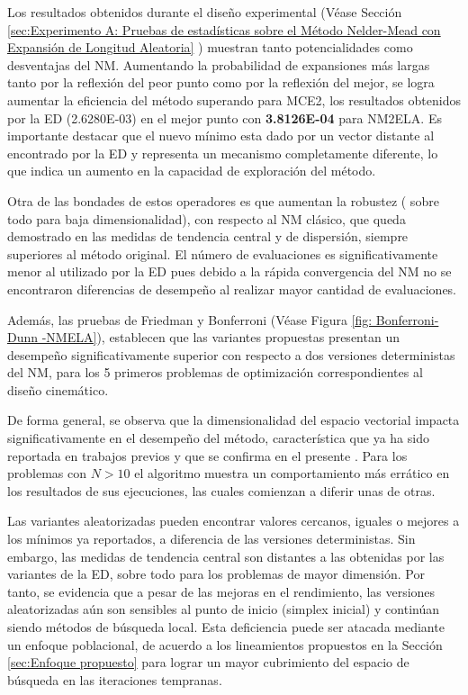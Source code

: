 Los resultados obtenidos durante el diseño experimental (Véase Sección \ref{sec:Experimento A: Pruebas de estadísticas sobre el Método Nelder-Mead con Expansión de Longitud Aleatoria} ) muestran tanto potencialidades como desventajas del NM. Aumentando la probabilidad de expansiones más largas tanto por la reflexión del peor punto como por la reflexión del mejor, se logra aumentar la eficiencia del método superando para MCE2, los resultados obtenidos por la ED (2.6280E-03) en el mejor punto con \textbf{3.8126E-04} para NM2ELA. Es importante destacar que el nuevo mínimo esta dado por un vector distante al encontrado por la ED y representa un mecanismo completamente diferente, lo que indica un aumento en la capacidad de exploración del método. 

Otra de las bondades de estos operadores es que aumentan la robustez ( sobre todo para baja dimensionalidad), con respecto al NM clásico, que queda demostrado en las medidas de tendencia central y de dispersión, siempre superiores al método original. El número de evaluaciones es significativamente menor al utilizado por la ED pues debido a la rápida convergencia del NM no se encontraron diferencias de desempeño al realizar mayor cantidad de evaluaciones. 

Además, las pruebas de Friedman y Bonferroni (Véase Figura \ref{fig: Bonferroni-Dunn -NMELA}), establecen que  las variantes propuestas presentan un desempeño significativamente superior con respecto a dos versiones deterministas del NM, para los 5 primeros problemas de optimización correspondientes al diseño cinemático.

De forma general, se observa que la dimensionalidad del espacio vectorial impacta significativamente en el desempeño del método, característica que ya ha sido reportada en trabajos previos y que se confirma en el presente \cite{han_effect_2006}. Para los problemas con $N>10$ el algoritmo muestra un comportamiento más errático en los resultados de sus ejecuciones, las cuales comienzan a diferir unas de otras. 

 Las variantes aleatorizadas pueden encontrar valores cercanos, iguales o mejores a los mínimos ya reportados, a diferencia  de las versiones deterministas. Sin embargo, las medidas de tendencia central son distantes a las obtenidas por las variantes de la ED, sobre todo para los problemas de mayor dimensión. Por tanto, se evidencia que a pesar de las mejoras en el rendimiento, las versiones aleatorizadas aún son sensibles al punto de inicio (simplex inicial) y continúan siendo métodos de búsqueda local. Esta deficiencia puede ser atacada mediante un enfoque poblacional, de acuerdo a los lineamientos propuestos en la Sección \ref{sec:Enfoque propuesto} para lograr un mayor cubrimiento del espacio de búsqueda en las iteraciones tempranas.

